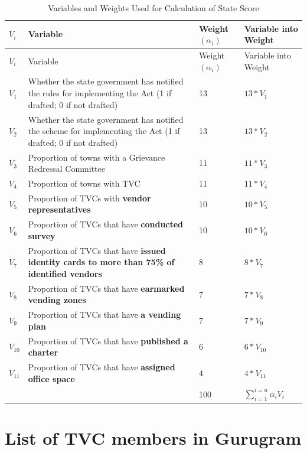 \documentclass[a4paper, 12pt, twoside]{article}
\begin{document}
{{%
\begin{longtable}[l]{>{\raggedright}p{1.5cm}>{\raggedright}p{6cm}>{\raggedright}p{2.5cm}>{\raggedright\arraybackslash}p{4cm}}
  \caption{Variables and Weights Used for Calculation of State Score}\\
    \toprule
$V_i$ & Variable & Weight $(\alpha_i)$ & Variable into Weight \\
\midrule
\endfirsthead
$V_i$ & Variable & Weight $(\alpha_i)$ & Variable into Weight \\
\midrule
\endhead
\bottomrule
\endfoot
\bottomrule
\endlastfoot
$V_1$ & Whether the state government has notified the rules for implementing the Act (1 if drafted; 0 if not drafted) & 13 & $13 * V_1$\\
$V_2$ & Whether the state government has notified the scheme for implementing the Act (1 if drafted; 0 if not drafted) & 13 & $13 * V_2$\\
$V_3$ & Proportion of towns with a Grievance Redressal Committee & 11 & $11 * V_3$\\
$V_4$ & Proportion of towns with TVC & 11 & $11 * V_4$\\
$V_5$ & Proportion of TVCs with \textbf{vendor representatives} & 10 & $10 * V_5$\\
$V_6$ & Proportion of TVCs that have \textbf{conducted survey} & 10 & $10 * V_6$\\
$V_7$ & Proportion of TVCs that have \textbf{issued identity cards to more than 75\% of identified vendors} & 8 & $8 * V_7$\\
$V_8$ & Proportion of TVCs that have \textbf{earmarked vending zones} & 7 & $7 * V_8$\\
$V_9$ & Proportion of TVCs that have \textbf{a vending plan} & 7 & $7 * V_9$\\
$V_{10}$ & Proportion of TVCs that have \textbf{published a charter} & 6 & $6 * V_{10}$\\
$V_{11}$ & Proportion of TVCs that have \textbf{assigned office space} & 4 & $4 * V_{11}$\\
\midrule
& & 100 & $\sum_{i = 1}^{i = n} \alpha_i V_i$\\
\end{longtable}




\newpage
\section{List of TVC members in Gurugram}
\label{appendix: TVC members}
}}
\end{document}
